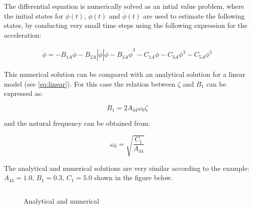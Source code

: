 The differential equation is numerically solved as an intial value
problem, where the initial states for $\phi(t)$, $\dot{\phi}(t)$ and
$\ddot{\phi}(t)$ are used to estimate the following states, by
conducting very small time steps using the following expression for the
acceleration:
 
            
    
    \begin{equation}
\begin{aligned}
\ddot{\phi} = - B_{1A} \dot{\phi} - B_{2A} \left|{\dot{\phi}}\right| \dot{\phi} - B_{3A} \dot{\phi}^{3} - C_{1A} \phi - C_{3A} \phi^{3} - C_{5A} \phi^{5}
\end{aligned}
\label{eq:equation}
\end{equation}

    

    This numerical solution can be compared with an analytical solution for
a linear model (see \ref{eq:linear}). For this case the relation
between $\zeta$ and $B_1$ can be expressed as:
 
            
    
    \begin{equation}
B_{1} = 2 A_{44} \omega_{0} \zeta
\label{eq:equation}
\end{equation}

    

    and the natural frequency can be obtained from:
 
            
    
    \begin{equation}
\omega_{0} = \sqrt{\frac{C_{1}}{A_{44}}}
\label{eq:equation}
\end{equation}

    

    The analytical and numerical solutions are very similar according to the
example: $A_{44} = 1.0$, $B_1 = 0.3$, $C_1 = 5.0$ shown in the
figure below.

    \begin{Verbatim}[commandchars=\\\{\}]

    \end{Verbatim}

    \begin{figure}
        \begin{center}\end{center}
        \caption{Analytical and numerical}
        \label{fig:analytical_numerical}
    \end{figure}
    
    